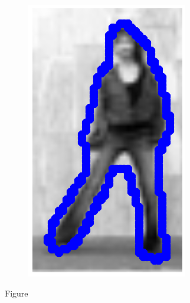 \begin{figure}[t!]
\begin{subfigure}[b]{0.1\textwidth}
            \includegraphics[width=\textwidth]{resources/intro_3_2}
    \end{subfigure}
    \caption{Figure}
\end{figure}

